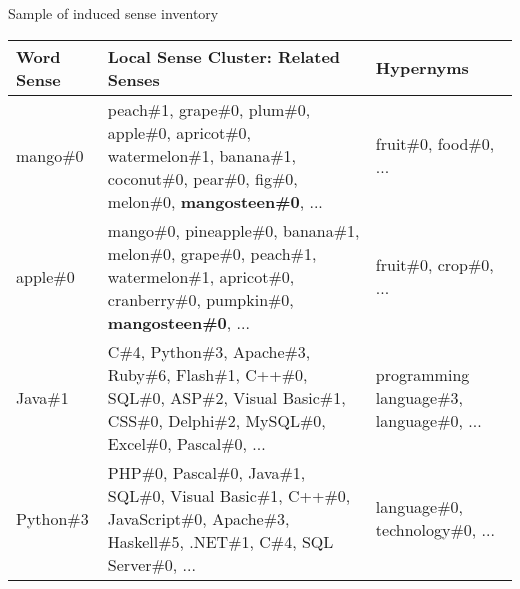 	
\begin{frame}{Sample of induced \alert{sense inventory}}


\begin{table}
\centering
\scriptsize
\begin{tabular}{l|p{6cm}|p{2.5cm}} 
\bf Word Sense & \bf Local Sense Cluster: Related Senses & \bf Hypernyms \\
\toprule
 \alert{mango\#0} &  peach\#1, grape\#0, plum\#0, apple\#0, apricot\#0, watermelon\#1, banana\#1, coconut\#0, pear\#0, fig\#0, melon\#0,  \alert{\textbf{mangosteen\#0}}, ... & fruit\#0, food\#0, ... \\
 
\midrule
\alert{apple\#0} & mango\#0, pineapple\#0, banana\#1, melon\#0, grape\#0, peach\#1, watermelon\#1, apricot\#0, cranberry\#0, pumpkin\#0, \alert{\textbf{mangosteen\#0}}, ... & fruit\#0, crop\#0,  ... \\

\midrule
Java\#1 & C\#4, Python\#3, Apache\#3, Ruby\#6, Flash\#1, C++\#0, SQL\#0, ASP\#2, Visual Basic\#1, CSS\#0, Delphi\#2, MySQL\#0, Excel\#0, Pascal\#0, ... & programming language\#3, language\#0, ... \\

\midrule
Python\#3 & PHP\#0, Pascal\#0, Java\#1, SQL\#0, Visual Basic\#1, C++\#0, JavaScript\#0, Apache\#3, Haskell\#5, .NET\#1, C\#4, SQL Server\#0, ... & language\#0, technology\#0, ... \\

\end{tabular}


\end{table}



\end{frame}


